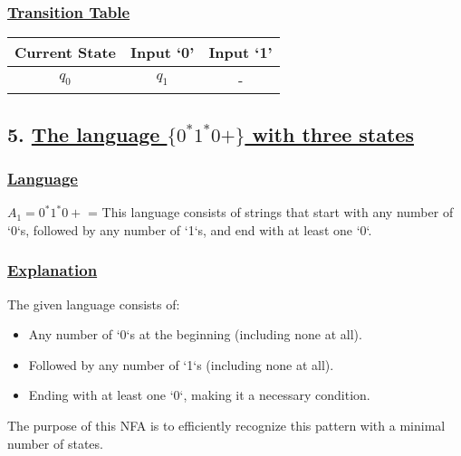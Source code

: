 \documentclass[12pt]{article}
\begin{document}
	\subsubsection*{\underline{Transition Table}}
	\begin{center}
		\begin{tabular}{ccc}
			\toprule
			\textbf{Current State} & \textbf{Input `0'} & \textbf{Input `1'} \\
			\midrule
			$q_0$ & $q_1$ & - \\
			\bottomrule
		\end{tabular}
	\end{center}
	
	\newpage
	\subsection*{5. \underline{The language \( \{ 0^*1^* 0+\} \) with three states}}
	
	\vspace{2mm}
	
	\subsubsection*{\underline{Language}}
	\begin{tcolorbox}[colback=white,colframe=transitioncol,arc=0mm]
		\( A_1 =  0^*1^* 0+\) = This language consists of strings that start with any number of `0`s, followed by any number of `1`s, and end with at least one `0`.
	\end{tcolorbox}
	
	\subsubsection*{\underline{Explanation}}
	The given language consists of:
	\begin{itemize}
		\item Any number of `0`s at the beginning (including none at all).
		\item Followed by any number of `1`s (including none at all).
		\item Ending with at least one `0`, making it a necessary condition.
	\end{itemize}
	The purpose of this NFA is to efficiently recognize this pattern with a minimal number of states.
	
\end{document}
